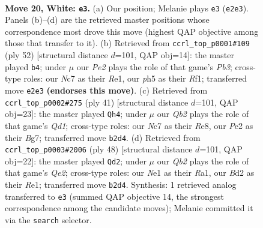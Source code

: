 \documentclass[11pt]{article}
\begin{document}
\clearpage

\begin{figure}[p]\centering
\begin{subfigure}{0.46\textwidth}\centering
\resizebox{\linewidth}{!}{%
\newchessgame
\chessboard[
  setfen={r1b4r/1pN2k2/1nn5/2b3pp/5p1q/3P1P2/PQ1BP1B1/R3NRK1 w - - 1 20},
  showmover=false,
  pgfstyle=straightmove, color=movearrow, markmove={e2-e3}
]}
\caption{}
\end{subfigure}\hfill
\begin{subfigure}{0.46\textwidth}\centering
\resizebox{\linewidth}{!}{%
\newchessgame
\chessboard[
  setfen={6k1/1b1qbrp1/p4n1p/1p1P1p2/3Q1P2/1PN4P/P2B3K/4RR2 w - - 1 27},
  showmover=false,
  pgfstyle=straightmove, color=movearrow, markmove={b3-b4}
]}
\caption{}
\end{subfigure}
\\[4pt]
\begin{subfigure}{0.46\textwidth}\centering
\resizebox{\linewidth}{!}{%
\newchessgame
\chessboard[
  setfen={3qrrk1/5pb1/1pN1b1pp/2npB3/4nP2/2N4P/1PP3P1/R2QRBK1 b - - 0 21},
  showmover=false,
  pgfstyle=straightmove, color=movearrow, markmove={d8-h4}
]}
\caption{}
\end{subfigure}\hfill
\begin{subfigure}{0.46\textwidth}\centering
\resizebox{\linewidth}{!}{%
\newchessgame
\chessboard[
  setfen={1n3r1k/4nqp1/bp1b3p/3p4/P2Pp3/4B2P/1P2QPPN/R3RN1K w - - 3 25},
  showmover=false,
  pgfstyle=straightmove, color=movearrow, markmove={e2-d2}
]}
\caption{}
\end{subfigure}
\caption{\textbf{Move 20, White: \texttt{e3}.} (a) Our position; Melanie plays \texttt{e3} (\texttt{e2e3}). Panels (b)--(d) are the retrieved master positions whose correspondence most drove this move (highest QAP objective among those that transfer to it). (b) Retrieved from \texttt{ccrl\_top\_p0001\#109} (ply 52) [structural distance $d$=101, QAP obj=14]: the master played \texttt{b4}; under $\mu$ our \emph{Pe2} plays the role of that game's \emph{Pb3}; cross-type roles: our \emph{N}c7 as their \emph{R}e1, our \emph{p}h5 as their \emph{R}f1; transferred move \texttt{e2e3} \textbf{(endorses this move)}. (c) Retrieved from \texttt{ccrl\_top\_p0002\#275} (ply 41) [structural distance $d$=101, QAP obj=23]: the master played \texttt{Qh4}; under $\mu$ our \emph{Qb2} plays the role of that game's \emph{Qd1}; cross-type roles: our \emph{N}c7 as their \emph{R}e8, our \emph{P}e2 as their \emph{B}g7; transferred move \texttt{b2d4}. (d) Retrieved from \texttt{ccrl\_top\_p0003\#2006} (ply 48) [structural distance $d$=101, QAP obj=22]: the master played \texttt{Qd2}; under $\mu$ our \emph{Qb2} plays the role of that game's \emph{Qe2}; cross-type roles: our \emph{N}e1 as their \emph{R}a1, our \emph{B}d2 as their \emph{R}e1; transferred move \texttt{b2d4}. Synthesis: 1 retrieved analog transferred to \texttt{e3} (summed QAP objective 14, the strongest correspondence among the candidate moves); Melanie committed it via the \texttt{search} selector.}
\label{fig:thought-m38}
\end{figure}
\end{document}
